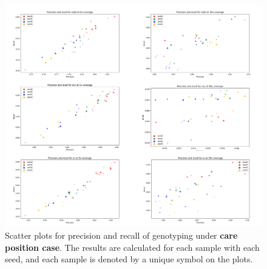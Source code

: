 \documentclass{PHlab-thesis}
\begin{document}
\begin{figure}[ht!]
	\centering
	\includegraphics[scale=0.3]{figures/care_genotyping.png}
	\caption{Scatter plots for precision and recall of genotyping under \textbf{care position case}. The results are calculated for each sample with each seed, and each sample is denoted by a unique symbol on the plots.}
	\label{fig:care_genotyping} %
\end{figure}
\end{document}
